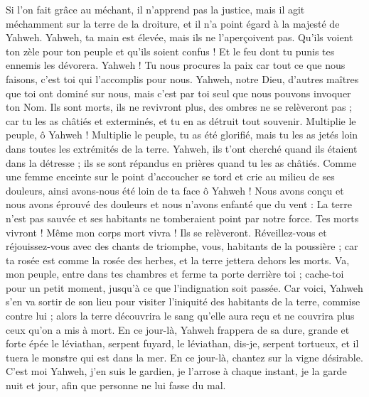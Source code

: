 \begin{multicols}{2}
Si l'on fait grâce au méchant, il n'apprend pas la justice, mais il agit méchamment sur la terre de la droiture, et il n'a point égard à la majesté de Yahweh.
Yahweh, ta main est élevée, mais ils ne l'aperçoivent pas. Qu'ils voient ton zèle pour ton peuple et qu'ils soient confus ! Et le feu dont tu punis tes ennemis les dévorera.
Yahweh ! Tu nous procures la paix car tout ce que nous faisons, c'est toi qui l'accomplis pour nous.
Yahweh, notre Dieu, d'autres maîtres que toi ont dominé sur nous, mais c'est par toi seul que nous pouvons invoquer ton Nom.
Ils sont morts, ils ne revivront plus, des ombres ne se relèveront pas ; car tu les as châtiés et exterminés, et tu en as détruit tout souvenir.
Multiplie le peuple, ô Yahweh ! Multiplie le peuple, tu as été glorifié, mais tu les as jetés loin dans toutes les extrémités de la terre.
Yahweh, ils t'ont cherché quand ils étaient dans la détresse ; ils se sont répandus en prières quand tu les as châtiés.
Comme une femme enceinte sur le point d'accoucher se tord et crie au milieu de ses douleurs, ainsi avons-nous été loin de ta face ô Yahweh !
Nous avons conçu et nous avons éprouvé des douleurs et nous n'avons enfanté que du vent : La terre n'est pas sauvée et ses habitants ne tomberaient point par notre force.
Tes morts vivront ! Même mon corps mort vivra ! Ils se relèveront. Réveillez-vous et réjouissez-vous avec des chants de triomphe, vous, habitants de la poussière ; car ta rosée est comme la rosée des herbes, et la terre jettera dehors les morts.
Va, mon peuple, entre dans tes chambres et ferme ta porte derrière toi ; cache-toi pour un petit moment, jusqu'à ce que l'indignation soit passée.
Car voici, Yahweh s'en va sortir de son lieu pour visiter l'iniquité des habitants de la terre, commise contre lui ; alors la terre découvrira le sang qu'elle aura reçu et ne couvrira plus ceux qu'on a mis à mort.
\VerseOne{}En ce jour-là, Yahweh frappera de sa dure, grande et forte épée le léviathan, serpent fuyard, le léviathan, dis-je, serpent tortueux, et il tuera le monstre qui est dans la mer.
En ce jour-là, chantez sur la vigne désirable.
C'est moi Yahweh, j'en suis le gardien, je l'arrose à chaque instant, je la garde nuit et jour, afin que personne ne lui fasse du mal.

\end{multicols}
